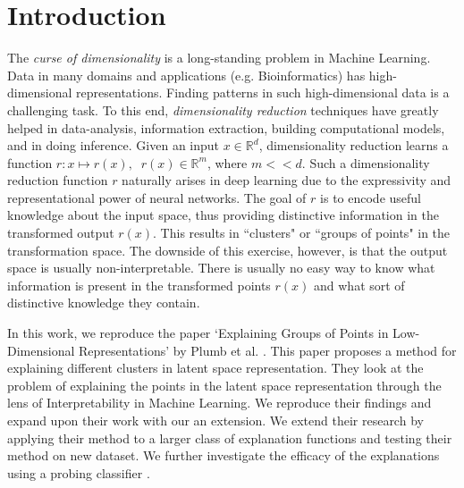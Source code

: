 \section{Introduction}
The \textit{curse of dimensionality} \cite{bishop:2006:PRML} is a long-standing problem in Machine Learning. Data in many domains and applications (e.g. Bioinformatics) has high-dimensional representations. Finding patterns in such high-dimensional data is a challenging task. To this end, \textit{dimensionality reduction} \cite{xie2018survey} techniques have greatly helped in data-analysis, information extraction, building computational models, and in doing inference. Given an input $x \in \mathbb{R}^{d}$, dimensionality reduction learns a function $r: x \mapsto r(x), \;\; r(x)\in \mathbb{R}^{m}$, where $m<<d$. Such a dimensionality reduction function $r$ naturally arises in deep learning due to the expressivity and representational power of neural networks. The goal of $r$ is to encode useful knowledge about the input space, thus providing distinctive information in the transformed output $r(x)$. This results in ``clusters" or ``groups of points" in the transformation space. The downside of this exercise, however, is that the output space is usually non-interpretable. There is usually no easy way to know what information is present in the transformed points $r(x)$ and what sort of distinctive knowledge they contain. 

In this work, we reproduce the paper `Explaining Groups of Points in Low-Dimensional Representations' by Plumb et al. \cite{plumb2020explaining}. This paper proposes a method for explaining different clusters in latent space representation. They look at the problem of explaining the points in the latent space representation through the lens of Interpretability in Machine Learning. 
We reproduce their findings and expand upon their work with our an extension. We extend their research by applying their method to a larger class of explanation functions and testing their method on new dataset. We further investigate the efficacy of the explanations using a probing classifier \cite{belinkov-etal-2020-interpretability}.

